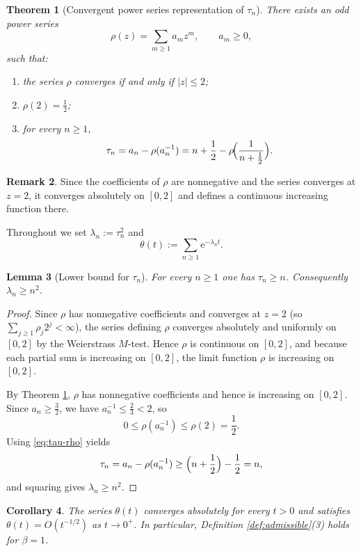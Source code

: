 \documentclass[11pt,letterpaper]{amsart}
\numberwithin{equation}{section}
\newtheorem{theorem}{Theorem}[section]
\newtheorem{lemma}[theorem]{Lemma}
\newtheorem{corollary}[theorem]{Corollary}
\theoremstyle{definition}
\newtheorem{remark}[theorem]{Remark}
\newcommand{\e}{\mathrm{e}}
\begin{document}
\begin{theorem}[Convergent power series representation of $\tau_n$]\label{thm:rho}
There exists an odd power series
\[
\rho(z)=\sum_{m\ge 1} a_m z^m,\qquad a_m\ge 0,
\]
such that:
\begin{enumerate}[label=\textup{(\arabic*)},leftmargin=2.5em]
\item the series $\rho$ converges if and only if $|z|\le 2$;
\item $\rho(2)=\tfrac12$;
\item for every $n\ge 1$,
\begin{equation}\label{eq:tau-rho}
\tau_n = a_n - \rho(a_n^{-1}) = n+\frac12 - \rho\!\Bigl(\frac{1}{n+\frac12}\Bigr).
\end{equation}
\end{enumerate}
\end{theorem}

\begin{remark}
Since the coefficients of $\rho$ are nonnegative and the series converges at $z=2$,
it converges absolutely on $[0,2]$ and defines a continuous increasing function there.
\end{remark}

Throughout we set $\lambda_n := \tau_n^2$ and
\[
\theta(t) := \sum_{n\ge 1}\e^{-\lambda_n t}.
\]

\begin{lemma}[Lower bound for $\tau_n$]\label{lem:tau-lower}
For every $n\ge 1$ one has $\tau_n\ge n$. Consequently $\lambda_n\ge n^2$.
\end{lemma}

\begin{proof}
Since $\rho$ has nonnegative coefficients and converges at $z=2$ (so $\sum_{j\ge1} \rho_j 2^j<\infty$),
the series defining $\rho$ converges absolutely and uniformly on $[0,2]$ by the Weierstrass $M$-test.
Hence $\rho$ is continuous on $[0,2]$, and because each partial sum is increasing on $[0,2]$,
the limit function $\rho$ is increasing on $[0,2]$.

By Theorem \ref{thm:rho}, $\rho$ has nonnegative coefficients and hence is increasing on $[0,2]$.
Since $a_n\ge \tfrac32$, we have $a_n^{-1}\le \tfrac23<2$, so
\[
0\le \rho(a_n^{-1})\le \rho(2)=\frac12.
\]
Using \eqref{eq:tau-rho} yields
\[
\tau_n = a_n - \rho(a_n^{-1}) \ge \Bigl(n+\frac12\Bigr) - \frac12 = n,
\]
and squaring gives $\lambda_n\ge n^2$.
\end{proof}

\begin{corollary}\label{cor:theta-basic}
The series $\theta(t)$ converges absolutely for every $t>0$ and satisfies
$\theta(t)=O(t^{-1/2})$ as $t\to 0^+$.
In particular, Definition \ref{def:admissible}\textup{(3)} holds for $\beta=1$.
\end{corollary}
\end{document}
